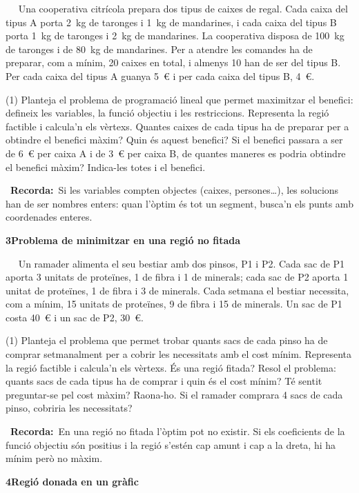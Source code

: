 \documentclass[11pt,a4paper]{article}
\newcounter{exer}
\newcommand{\ex}[1]{\par\needspace{4\baselineskip}\medskip\stepcounter{exer}\noindent{\color{navy}\bfseries\theexer.}\ \ }
\newcommand{\seccio}[2]{\par\needspace{10\baselineskip}\bigskip
  \begin{tcolorbox}[colback=navy,colframe=navy,coltext=white,arc=2mm,boxrule=0pt,left=3mm,right=3mm,top=1.2mm,bottom=1.2mm]
  {\large\bfseries #1\quad #2}
  \end{tcolorbox}\vspace{-2pt}}
\newcommand{\recorda}[1]{\par\smallskip\begin{tcolorbox}[colback=accent!7,colframe=accent!55,arc=2mm,boxrule=0.5pt,left=2.5mm,right=2.5mm,top=1mm,bottom=1mm]\small{\color{accent}\faLightbulb[regular]}\ \textbf{Recorda:}\ #1\end{tcolorbox}}
\begin{document}
\ex{1} Una cooperativa citrícola prepara dos tipus de caixes de regal. Cada caixa del tipus A porta 2~kg de taronges i 1~kg de mandarines, i cada caixa del tipus B porta 1~kg de taronges i 2~kg de mandarines. La cooperativa disposa de 100~kg de taronges i de 80~kg de mandarines. Per a atendre les comandes ha de preparar, com a mínim, 20 caixes en total, i almenys 10 han de ser del tipus B. Per cada caixa del tipus A guanya 5~€ i per cada caixa del tipus B, 4~€.\begin{tasks}(1)
  \task Planteja el problema de programació lineal que permet maximitzar el benefici: defineix les variables, la funció objectiu i les restriccions.
  \task Representa la regió factible i calcula'n els vèrtexs.
  \task Quantes caixes de cada tipus ha de preparar per a obtindre el benefici màxim? Quin és aquest benefici?
  \task Si el benefici passara a ser de 6~€ per caixa A i de 3~€ per caixa B, de quantes maneres es podria obtindre el benefici màxim? Indica-les totes i el benefici.
\end{tasks}\recorda{Si les variables compten objectes (caixes, persones…), les solucions han de ser nombres enters: quan l'òptim és tot un segment, busca'n els punts amb coordenades enteres.}


\seccio{3}{Problema de minimitzar en una regió no fitada}

\ex{1} Un ramader alimenta el seu bestiar amb dos pinsos, P1 i P2. Cada sac de P1 aporta 3 unitats de proteïnes, 1 de fibra i 1 de minerals; cada sac de P2 aporta 1 unitat de proteïnes, 1 de fibra i 3 de minerals. Cada setmana el bestiar necessita, com a mínim, 15 unitats de proteïnes, 9 de fibra i 15 de minerals. Un sac de P1 costa 40~€ i un sac de P2, 30~€.\begin{tasks}(1)
  \task Planteja el problema que permet trobar quants sacs de cada pinso ha de comprar setmanalment per a cobrir les necessitats amb el cost mínim.
  \task Representa la regió factible i calcula'n els vèrtexs. És una regió fitada?
  \task Resol el problema: quants sacs de cada tipus ha de comprar i quin és el cost mínim?
  \task Té sentit preguntar-se pel cost màxim? Raona-ho. Si el ramader comprara 4 sacs de cada pinso, cobriria les necessitats?
\end{tasks}\recorda{En una regió no fitada l'òptim pot no existir. Si els coeficients de la funció objectiu són positius i la regió s'estén cap amunt i cap a la dreta, hi ha mínim però no màxim.}


\seccio{4}{Regió donada en un gràfic}
\end{document}
